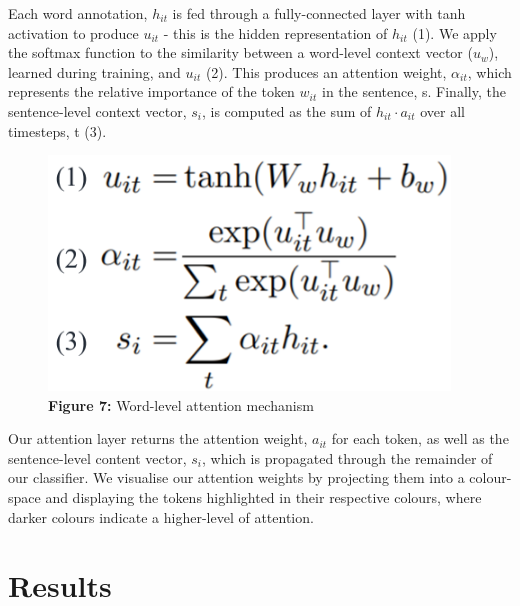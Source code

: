 \documentclass[12pt,a4paper]{article}
\begin{document}
\hspace{-17pt}\begin{minipage}{0.65\textwidth}
	 Each word annotation, $h_{it}$ is fed through a fully-connected layer with tanh activation to produce $u_{it}$ - this is the hidden representation of $h_{it}$ (1). We apply the softmax function to the similarity between a word-level context vector ($u_w$), learned during training, and $u_{it}$ (2). This produces an attention weight, $\alpha_{it}$, which represents the relative importance of the token $w_{it}$ in the sentence, s. Finally, the sentence-level context vector, $s_i$, is computed as the sum of $h_{it} \cdot a_{it}$ over all timesteps, t (3).
\end{minipage}
\hspace{2pt}
\begin{minipage}{0.35\textwidth}
\begin{figure}[H]
	\begin{center}
		\includegraphics[width=0.95\textwidth]{Images/wordLevelAttention.png}\\
		\textbf{Figure 7:} Word-level attention mechanism\cite{yang2016hierarchical}\\
	\end{center}
\end{figure}
\end{minipage}

\noindent Our attention layer returns the attention weight, $a_{it}$ for each token, as well as the sentence-level content vector, $s_i$, which is propagated through the remainder of our classifier. We visualise our attention weights by projecting them into a colour-space and displaying the tokens highlighted in their respective colours, where darker colours indicate a higher-level of attention.

\section{Results}\vspace{-8pt}
\end{document}

